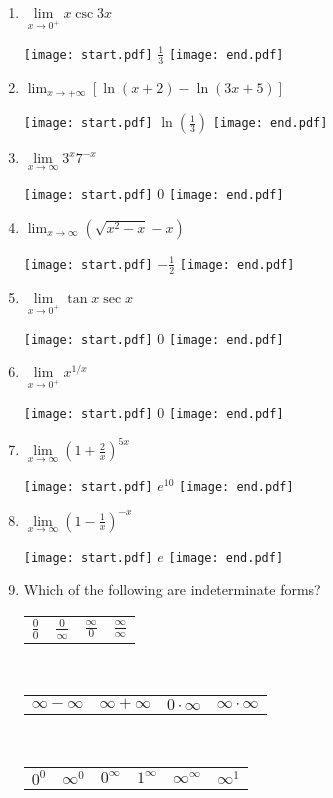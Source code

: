 \documentclass[12pt]{article}
\begin{document}
\begin{enumerate}
\item $\lim\limits_{x\rightarrow 0^+} x \csc{3x}$

\texttt{[image: start.pdf]}
{{$\frac{1}{3}$}}
\texttt{[image: end.pdf]}
  

\item $\lim_{x \rightarrow+\infty}\left[\ln{(x+2)}-\ln{(3x+5)}\right]$

\texttt{[image: start.pdf]}
{{$\ln{\left(\frac{1}{3}\right)}$}}
\texttt{[image: end.pdf]}


\item $\lim\limits_{x\rightarrow \infty} 3^{x}7^{-x}$ 

\texttt{[image: start.pdf]}
{{0}}
\texttt{[image: end.pdf]}


\item  $\displaystyle \lim_{x\rightarrow \infty}{\left(\sqrt{x^2-x}-x\right)}$

\texttt{[image: start.pdf]}
{{$\displaystyle -\frac{1}{2}$}}
\texttt{[image: end.pdf]}


\item $\lim\limits_{x\rightarrow 0^+} \tan{x}\sec{x}$ 

\texttt{[image: start.pdf]}
{{0}}
\texttt{[image: end.pdf]}


\item $\lim\limits_{x\rightarrow 0^+} x^{1/x}$ 

\texttt{[image: start.pdf]}
{{0}}
\texttt{[image: end.pdf]}


\item $\lim\limits_{x\rightarrow \infty} \left(1+\frac{2}{x}\right)^{5x}$ 

\texttt{[image: start.pdf]}
{{$e^{10}$}}
\texttt{[image: end.pdf]}


\item $\lim\limits_{x\rightarrow \infty} \left(1-\frac{1}{x}\right)^{-x}$ 

\texttt{[image: start.pdf]}
{{$e$}}
\texttt{[image: end.pdf]}


\item Which of the following are indeterminate forms?

\begin{center}
\begin{tabular}{cccc}
$\frac{0}{0}$ & $\frac{0}{\infty}$ & $\frac{\infty}{0}$& $\frac{\infty}{\infty}$
\end{tabular}\\
\medskip
\begin{tabular}{cccc}
$\infty-\infty$ & $\infty+\infty$ & $0 \cdot \infty$ & $\infty \cdot \infty$
\end{tabular}\\
\medskip
\begin{tabular}{cccccc}
$0^0$ & $\infty^0$ & $0^{\infty}$ & $1^\infty$ & $\infty^{\infty}$ & $\infty^{1}$
\end{tabular}
\end{center}


\end{enumerate}
\end{document}
